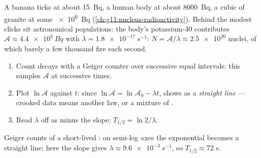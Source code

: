 \begin{example}\label{ex:g12:radioactive-decay:body}
A banana ticks at about \qty{15}{Bq}, a human body at about
\qty{8000}{Bq}, a cubic  of granite at some \qty{e6}{Bq}
(\cref{ch:g11:nucleus-radioactivity}). Behind the modest clicks sit
astronomical populations: the body's potassium-40 contributes
$\mathcal A \approx \qty{4.4e3}{Bq}$ with $\lambda =
\qty{1.8e-17}{s^{-1}}$: $N = \mathcal A/\lambda \approx \num{2.5e20}$
nuclei, of which barely a few thousand fire each second.
\end{example}

\begin{method}\label{met:g12:radioactive-decay:semilog}
\begin{enumerate}
  \item Count decays with a Geiger counter over successive equal
        intervals: this samples $\mathcal A$ at successive times.
  \item Plot $\ln \mathcal A$ against $t$: since
        $\ln \mathcal A = \ln \mathcal A_0 - \lambda t$,  shows as a \emph{straight line} --- crooked data means
        another law, or a mixture of .
  \item Read $\lambda$ off as minus the slope; $T_{1/2} = \ln 2/\lambda$.
\end{enumerate}
\end{method}

\begin{omfigure}

{\small Geiger counts of a short-lived : on semi-log axes the
exponential becomes a straight line; here the slope gives
$\lambda \approx \qty{9.6e-3}{s^{-1}}$, so $T_{1/2} \approx \qty{72}{s}$.}
\end{omfigure}


